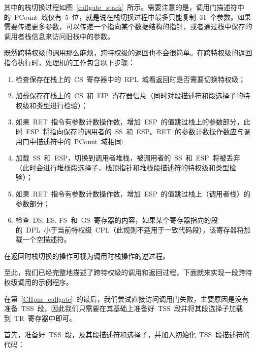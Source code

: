 
其中的栈切换过程如图~\ref{callgate_stack}~所示。需要注意的是，调用门描述符中的~PCount~域仅有~5~位，就是说在栈切换过程中最多只能复制~31~个参数。如果需要传递更多参数，可以传递一个指向某个数据结构的指针，或者通过栈中保存的调用者栈信息来访问旧栈中的参数。

既然跨特权级的调用那么麻烦，跨特权级的返回也不会很简单。在跨特权级的返回指令执行时，处理机的工作包含以下步骤：

\begin{enumerate}
\item 检查保存在栈上的~CS~寄存器中的~RPL~域看返回时是否需要切换特权级；
\item 加载保存在栈上的~CS~和~EIP~寄存器信息（同时对段描述符和段选择子的特权级和类型进行检验）；
\item 如果~RET~指令有参数计数操作数，增加~ESP~的值跳过栈上的参数部分，此时~ESP~将指向保存的调用者的~SS~和~ESP。RET~的参数计数操作数应与调用门中描述符中的~PCount~域相同;
\item 加载~SS~和~ESP，切换到调用者堆栈，被调用者的~SS~和~ESP~将被丢弃（此时会进行堆栈段选择子、栈顶指针和堆栈段描述符的特权级和类型检验）；
\item 如果~RET~指令有参数计数操作数，增加~ESP~的值跳过栈上（调用者栈）的参数部分；
\item 检查~DS, ES, FS~和~GS~寄存器的内容，如果某个寄存器指向的段的~DPL~小于当前特权级~CPL（此规则不适用于一致代码段），该寄存器将加载一个空描述符。
\end{enumerate}

在返回时栈切换的操作可视为调用时栈操作的逆过程。

至此，我们已经完整地描述了跨特权级的调用和返回过程，下面就来实现一段跨特权级调用的示例程序。

在第~\ref{CHpm_callgate}~的最后，我们尝试直接访问调用门失败，主要原因是没有准备~TSS~段，因此我们只需要在其基础上准备好~TSS~段并将其段选择子加载到~TR~寄存器中即可。

首先，准备好~TSS~段，及其段描述符和选择子，并加入初始化~TSS~段描述符的代码：

\label{CHpm_tss_desc}

